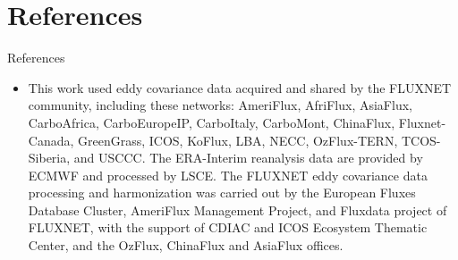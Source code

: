 \documentclass{beamer}
\begin{document}
     


\section{References}
\begin{frame}{References}
  \AtNextBibliography{\small}
  \printbibliography
  \scriptsize
  \begin{itemize}
  \item This work used eddy covariance data acquired and shared by the FLUXNET community, including these networks: AmeriFlux, AfriFlux, AsiaFlux, CarboAfrica, CarboEuropeIP, CarboItaly, CarboMont, ChinaFlux, Fluxnet-Canada, GreenGrass, ICOS, KoFlux, LBA, NECC, OzFlux-TERN, TCOS-Siberia, and USCCC. The ERA-Interim reanalysis data are provided by ECMWF and processed by LSCE. The FLUXNET eddy covariance data processing and harmonization was carried out by the European Fluxes Database Cluster, AmeriFlux Management Project, and Fluxdata project of FLUXNET, with the support of CDIAC and ICOS Ecosystem Thematic Center, and the OzFlux, ChinaFlux and AsiaFlux offices.
    \end{itemize}
\end{frame}


\end{document}
